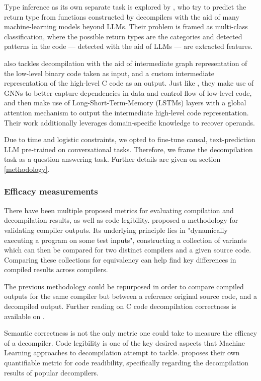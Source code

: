 \documentclass[../main.tex]{subfiles}
\begin{document}
Type inference as its own separate task is explored by \cite{escalada_improving_2021},
who try to predict the return type from functions constructed by decompilers with
the aid of many machine-learning models beyond LLMs. Their problem is framed as
multi-class classification, where the possible return types are the categories and
detected patterns in the code — detected with the aid of LLMs — are extracted features.

\cite{cao_boosting_2022} also tackles decompilation with the aid of intermediate
graph representation of the low-level binary code taken as input, and a custom
intermediate representation of the high-level C code as an output. Just like 
\cite{fu_n-bref_2020}, they make use of GNNs to better capture dependencies in 
data and control flow of low-level code, and then make use of Long-Short-Term-Memory
(LSTMs) layers with a global attention mechanism to output the intermediate high-level
code representation.  Their work additionally leverages domain-specific knowledge
to recover operands.

Due to time and logistic constraints, we opted to fine-tune causal, text-prediction
LLM pre-trained on conversational tasks. Therefore, we frame the decompilation task
as a question answering task. Further details are given on section \ref{methodology}.

\subsubsection{Efficacy measurements}

There have been multiple proposed metrics for evaluating compilation and decompilation
results, as well as code legibility. \cite{le_compiler_2014} proposed a methodology
for validating compiler outputs. Its underlying principle lies in "dynamically
executing a program on some test inputs", constructing a collection of variants
which can then be compared for two distinct compilers and a given source code.
Comparing these collections for equivalency can help find key differences in compiled
results across compilers.

The previous methodology could be repurposed in order to compare compiled outputs
for the same compiler but between a reference original source code, and a decompiled
output. Further reading on C code decompilation correctness is available on 
\cite{liu_how_2020}.

Semantic correctness is not the only metric one could take to measure the efficacy
of a decompiler. Code legibility is one of the key desired aspects that Machine
Learning approaches to decompilation attempt to tackle. \cite{eom_r2i_2024} proposes
their own quantifiable metric for code readibility, specifically regarding the
decompilation results of popular decompilers.
\end{document}
